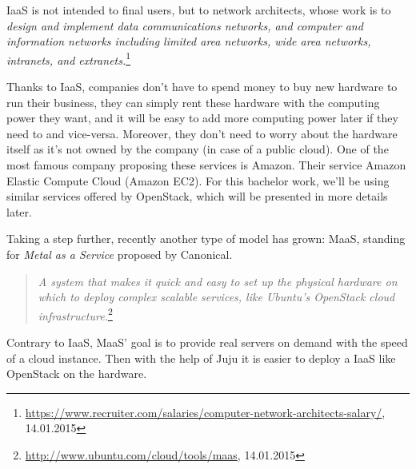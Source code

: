 IaaS is not intended to final users, but to network architects, whose work is to 
\textit{design and implement data communications networks, and computer and information networks including limited area networks, wide area networks, intranets, and extranets.}\footnote{\url{https://www.recruiter.com/salaries/computer-network-architects-salary/}, 14.01.2015}

Thanks to IaaS, companies don't have to spend money to buy new hardware to run their business, they can simply rent these hardware with the computing power they want, and it will be easy to add more computing power later if they need to and vice-versa. 
Moreover, they don't need to worry about the hardware itself as it's not owned by the company (in case of a public cloud). 
One of the most famous company proposing these services is Amazon. 
Their service Amazon Elastic Compute Cloud (Amazon EC2). 
For this bachelor work, we'll be using similar services offered by OpenStack, which will be presented in more details later.

Taking a step further, recently another type of model has grown: MaaS, standing for \textit{Metal as a Service} proposed by Canonical. 

\begin{quotation}
\textit{A system that makes it quick and easy to set up the physical hardware on which to deploy complex scalable services, like Ubuntu’s OpenStack cloud infrastructure.}\footnote{\url{http://www.ubuntu.com/cloud/tools/maas}, 14.01.2015}
\end{quotation}

Contrary to IaaS, MaaS' goal is to provide real servers on demand with the speed of a cloud instance. Then with the help of Juju it is easier to deploy a IaaS like OpenStack on the hardware.






